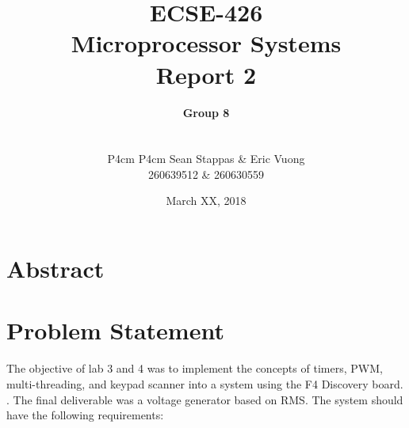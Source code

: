 \documentclass[a4paper,titlepage]{article}
\title{\textbf{ECSE-426 \\ Microprocessor Systems \\ Report 2}}
\author{
    \textbf{Group 8} \\ \\
    \begin{tabular}{P{4cm} P{4cm}}
    Sean Stappas & Eric Vuong \\
    260639512 & 260630559  \\
    \end{tabular}
}
\date{March XX, 2018}
\begin{document}
\sloppy

\maketitle
\clearpage

\section{Abstract}


\section{Problem Statement}

The objective of lab 3 and 4 was to implement the concepts of timers, PWM, multi-threading, and keypad scanner into a system using the F4 Discovery board. . The final deliverable was a voltage generator based on RMS. The system should have the following requirements:
\end{document}
